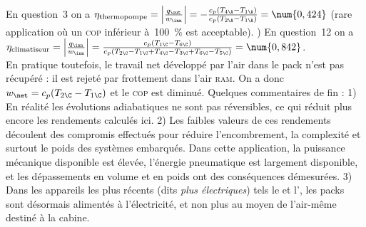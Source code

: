 \begin{description}
			En question~3 on a $\eta_\text{thermopompe}
			= \left|\frac{q_\out}{w_\inn}\right|
			= -\frac{c_p (T_{4\A} - T_{1\A})}{c_p (T_{2\A}-T_{1\A})}
			= \num{0,424}$ (rare application où un \textsc{cop} inférieur à~\SI{100}{\percent} est acceptable).
			\tab{}) En question~12 on a $\eta_\text{climatiseur} = \left|\frac{q_\inn}{w_\inn}\right| = \frac{c_p(T_{1\C} - T_{6\C})}{c_p (T_{2\C} - T_{1\C} + T_{4\C} - T_{3\C} + T_{6\C} - T_{5\C})} = \num{0,842} $.\\
			En pratique toutefois, le travail net développé par l’air dans le pack n’est pas récupéré : il est rejeté par frottement dans l’air \textsc{ram}. On a donc $w_\net = c_p(T_{2\C} - T_{1\C})$ et le \textsc{cop} est diminué.
			\tab Quelques commentaires de fin : 1) En réalité les évolutions adiabatiques ne sont pas réversibles, ce qui réduit plus encore les rendements calculés ici. 2) Les faibles valeurs de ces rendements découlent des compromis effectués pour réduire l’encombrement, la complexité et surtout le poids des systèmes embarqués. Dans cette application, la puissance mécanique disponible est élevée, l’énergie pneumatique est largement disponible, et les dépassements en volume et en poids ont des conséquences démesurées. 3) Dans les appareils les plus récents (dits \textit{plus électriques}) tels le  et l’, les packs sont désormais alimentés à l’électricité, et non plus au moyen de l’air-même destiné à la cabine.
\end{description}
